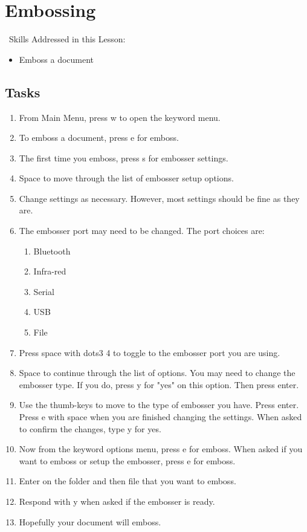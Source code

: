 \documentclass[10pt,letterpaper,twoside]{report}
\begin{document}
{{{%
\clearpage
\section{ Embossing}
\
Skills Addressed in this Lesson:
\begin{itemize}
	\item Emboss a document
\end{itemize}
\subsection{Tasks}
\begin{enumerate}
	\item From Main Menu, press w to open the keyword menu.
	\item To emboss a document, press e for emboss.
	\item The first time you emboss, press s for embosser settings.
	\item Space to move through the list of embosser setup options.
	\item Change settings as necessary.  However, most settings should be fine as they are.
	\item The embosser port may need to be changed.  The port choices are:
	      \begin{enumerate}
		      \item Bluetooth
		      \item Infra-red
		      \item  Serial
		      \item USB
		      \item File
	      \end{enumerate}
	\item Press space with dots3 4 to toggle to the embosser port you are using.
	\item Space to continue through the list of options.  You may need to change the embosser type. If you do, press y for "yes" on this option.  Then press enter.
	\item Use the thumb-keys to move to the type of embosser you have.  Press enter. Press e with space when you are finished changing the settings.  When asked to confirm the changes, type y for yes.
	\item Now from the keyword options menu, press e for emboss.  When asked if you want to emboss or setup the embosser, press e for emboss.
	\item Enter on the folder and then file that you want to emboss.
	\item Respond with y when asked if the embosser is ready.
	\item Hopefully your document will emboss.
\end{enumerate}
}}}
\end{document}
